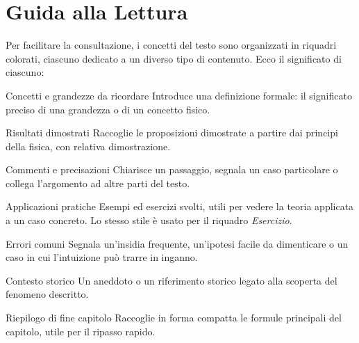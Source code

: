 \chapter*{Guida alla Lettura}
\thispagestyle{empty}

Per facilitare la consultazione, i concetti del testo sono organizzati in riquadri colorati, ciascuno dedicato a un diverso tipo di contenuto. Ecco il significato di ciascuno:

\begin{definizione}{Concetti e grandezze da ricordare}
Introduce una definizione formale: il significato preciso di una grandezza o di un concetto fisico.
\end{definizione}

\begin{teorema}{Risultati dimostrati}
Raccoglie le proposizioni dimostrate a partire dai principi della fisica, con relativa dimostrazione.
\end{teorema}

\begin{osservazione}{Commenti e precisazioni}
Chiarisce un passaggio, segnala un caso particolare o collega l'argomento ad altre parti del testo.
\end{osservazione}

\begin{esempio}{Applicazioni pratiche}
Esempi ed esercizi svolti, utili per vedere la teoria applicata a un caso concreto. Lo stesso stile è usato per il riquadro \textit{Esercizio}.
\end{esempio}

\begin{attenzione}{Errori comuni}
Segnala un'insidia frequente, un'ipotesi facile da dimenticare o un caso in cui l'intuizione può trarre in inganno.
\end{attenzione}

\begin{notastorica}{Contesto storico}
Un aneddoto o un riferimento storico legato alla scoperta del fenomeno descritto.
\end{notastorica}

\begin{formulario}{Riepilogo di fine capitolo}
Raccoglie in forma compatta le formule principali del capitolo, utile per il ripasso rapido.
\end{formulario}
